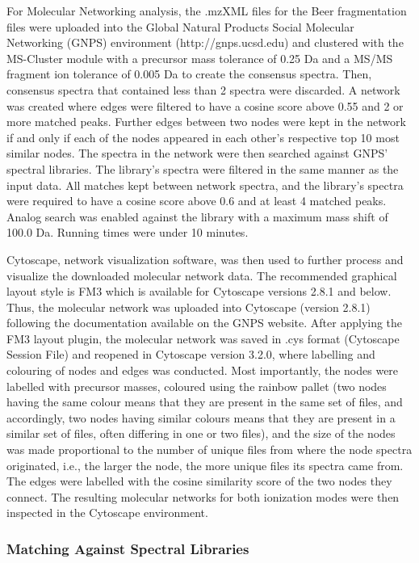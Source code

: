 For Molecular Networking analysis, the .mzXML files for the Beer fragmentation files were uploaded into the Global Natural Products Social Molecular Networking (GNPS) environment (http://gnps.ucsd.edu) and clustered with the MS-Cluster module with a precursor mass tolerance of 0.25 Da and a MS/MS fragment ion tolerance of 0.005 Da to create the consensus spectra. Then, consensus spectra that contained less than 2 spectra were discarded. A network was created where edges were filtered to have a cosine score above 0.55 and 2 or more matched peaks. Further edges between two nodes were kept in the network if and only if each of the nodes appeared in each other's respective top 10 most similar nodes. The spectra in the network were then searched against GNPS' spectral libraries. The library’s spectra were filtered in the same manner as the input data. All matches kept between network spectra, and the library’s spectra were required to have a cosine score above 0.6 and at least 4 matched peaks. Analog search was enabled against the library with a maximum mass shift of 100.0 Da. Running times were under 10 minutes.

Cytoscape, network visualization software, was then used to further process and visualize the downloaded molecular network data. The recommended graphical layout style is FM3 which is available for Cytoscape versions 2.8.1 and below. Thus, the molecular network was uploaded into Cytoscape (version 2.8.1) following the documentation available on the GNPS website. After applying the FM3 layout plugin, the molecular network was saved in .cys format (Cytoscape Session File) and reopened in Cytoscape version 3.2.0, where labelling and colouring of nodes and edges was conducted. Most importantly, the nodes were labelled with precursor masses, coloured using the rainbow pallet (two nodes having the same colour means that they are present in the same set of files, and accordingly, two nodes having similar colours means that they are present in a similar set of files, often differing in one or two files), and the size of the nodes was made proportional to the number of unique files from where the node spectra originated, i.e., the larger the node, the more unique files its spectra came from. The edges were labelled with the cosine similarity score of the two nodes they connect. The resulting molecular networks for both ionization modes were then inspected in the Cytoscape environment.

\subsubsection{Matching Against Spectral Libraries}


